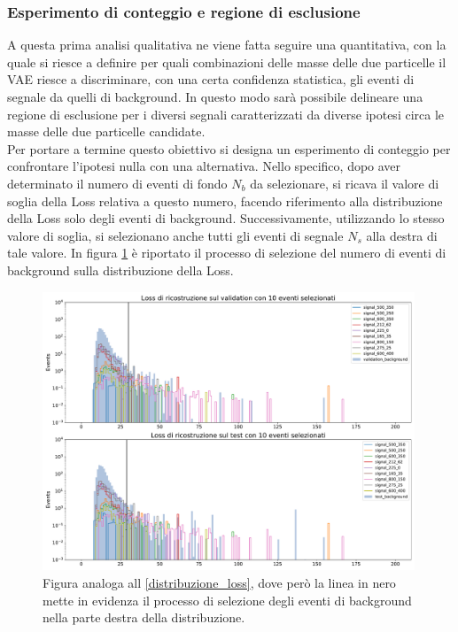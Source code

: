 \newpage

\subsubsection{Esperimento di conteggio e regione di esclusione}
\label{esperimento di conteggio e regione di esclusione}

A questa prima analisi qualitativa ne viene fatta seguire una quantitativa, con la quale si riesce a definire per quali combinazioni delle masse delle due particelle il VAE riesce a discriminare, con una certa confidenza statistica, gli eventi di segnale da quelli di background. In questo modo sarà possibile delineare una regione di esclusione per i diversi segnali caratterizzati da diverse ipotesi circa le masse delle due particelle candidate.\\
Per portare a termine questo obiettivo si designa un esperimento di conteggio per confrontare l'ipotesi nulla con una alternativa. Nello specifico, dopo aver determinato il numero di eventi di fondo $N_b$ da selezionare, si ricava il valore di soglia della Loss relativa a questo numero, facendo riferimento alla distribuzione della Loss solo degli eventi di background. Successivamente, utilizzando lo stesso valore di soglia, si selezionano anche tutti gli eventi di segnale $N_s$ alla destra di tale valore. In figura \ref{distribuzioneLossRiga} è riportato il processo di selezione del numero di eventi di background sulla distribuzione della Loss. \\

\begin{figure}[h!]
	\centering
	\includegraphics[width=0.99\textwidth]{figs/risultati_simulazione/distribuzioneLossRiga.pdf}
	\caption{Figura analoga all \ref{distribuzione_loss}, dove però la linea in nero mette in evidenza il processo di selezione degli eventi di background nella parte destra della distribuzione.}
	\label{distribuzioneLossRiga}
\end{figure}


